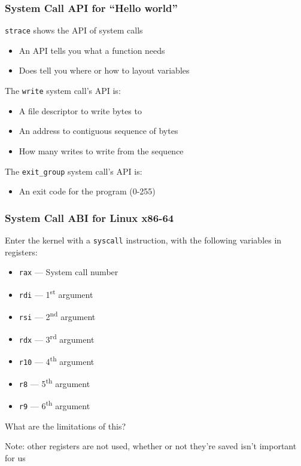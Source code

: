 \documentclass[aspectratio=169]{beamer}
\begin{document}
  \begin{frame}
    \frametitle{System Call API for ``Hello world''}

    \texttt{strace} shows the API of system calls

    \begin{itemize}
      \item An API tells you what a function needs
      \item Does  tell you where or how to layout variables
    \end{itemize}

    \vspace{1em}

    The \texttt{write} system call's API is:
    \begin{itemize}
      \item A file descriptor to write bytes to
      \item An address to contiguous sequence of bytes
      \item How many writes to write from the sequence
    \end{itemize}
    
    \vspace{1em}

    The \texttt{exit\_group} system call's API is:
    \begin{itemize}
      \item An exit code for the program (0-255)
    \end{itemize}
  \end{frame}

  \begin{frame}
    \frametitle{System Call ABI for Linux x86-64}

    Enter the kernel with a \texttt{syscall} instruction, with the following
    variables in registers:

    \begin{itemize}
      \item \texttt{rax} --- System call number
      \item \texttt{rdi} --- 1\textsuperscript{st} argument
      \item \texttt{rsi} --- 2\textsuperscript{nd} argument
      \item \texttt{rdx} --- 3\textsuperscript{rd} argument
      \item \texttt{r10} --- 4\textsuperscript{th} argument
      \item \texttt{r8} --- 5\textsuperscript{th} argument
      \item \texttt{r9} --- 6\textsuperscript{th} argument
    \end{itemize}

    What are the limitations of this?

    \vspace{2em}

    Note: other registers are not used, whether or not they're saved isn't
    important for us
  \end{frame}
\end{document}
